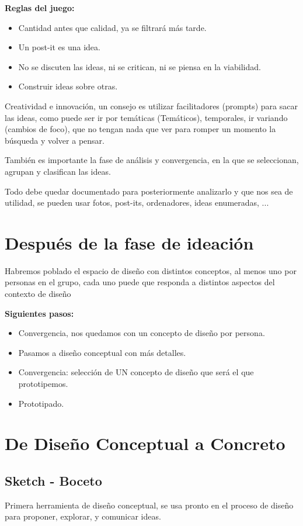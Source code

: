 \documentclass[12pt]{report} %
\begin{document}
\textbf{Reglas del juego:}
\begin{itemize}
  \item Cantidad antes que calidad, ya se filtrará más tarde.
  \item Un post-it es una idea.
  \item No se discuten las ideas, ni se critican, ni se piensa en la viabilidad.
  \item Construir ideas sobre otras.
\end{itemize}

Creatividad e innovación, un consejo es utilizar facilitadores (prompts) para sacar las ideas, como puede ser ir por temáticas (Temáticos), temporales, ir variando (cambios de foco), que no tengan nada que ver para romper un momento la búsqueda y volver a pensar.

También es importante la fase de análisis y convergencia, en la que se seleccionan, agrupan y clasifican las ideas.

Todo debe quedar documentado para posteriormente analizarlo y que nos sea de utilidad, se pueden usar fotos, post-its, ordenadores, ideas enumeradas, ...

\section{Después de la fase de ideación}

Habremos poblado el espacio de diseño con distintos conceptos, al menos uno por personas en el grupo, cada uno puede que responda a distintos aspectos del contexto de diseño

\textbf{Siguientes pasos:}
\begin{itemize}
  \item Convergencia, nos quedamos con un concepto de diseño por persona.
  \item Pasamos a diseño conceptual con más detalles.
  \item Convergencia: selección de UN concepto de diseño que será el que prototipemos.
  \item Prototipado.
\end{itemize}

\section{De Diseño Conceptual a Concreto}
\subsection{Sketch - Boceto}
Primera herramienta de diseño conceptual, se usa pronto en el proceso de diseño para proponer, explorar, y comunicar ideas.
\end{document}

